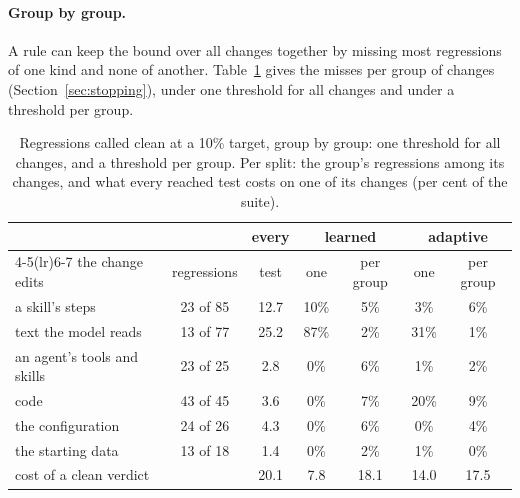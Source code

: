 \documentclass[11pt,a4paper]{article}
\begin{document}
\paragraph{Group by group.} A rule can keep the bound over all changes together by missing most regressions of
one kind and none of another. Table~\ref{tab:groups} gives the misses per group of changes
(Section~\ref{sec:stopping}), under one threshold for all changes and under a threshold per group.

\begin{table}[H]
\centering\small
\caption{Regressions called clean at a 10\% target, group by group: one threshold for all changes, and a
threshold per group. Per split: the group's regressions among its changes, and what every reached test costs on
one of its changes (per cent of the suite).}
\label{tab:groups}
\begin{tabular}{lcc cccc}
\toprule
 & & every & \multicolumn{2}{c}{learned} & \multicolumn{2}{c}{adaptive} \\
\cmidrule(lr){4-5}\cmidrule(lr){6-7}
the change edits & regressions & test & one & per group & one & per group \\
\midrule
a skill's steps & 23 of 85 & 12.7 & 10\% & 5\% & 3\% & 6\% \\
text the model reads & 13 of 77 & 25.2 & 87\% & 2\% & 31\% & 1\% \\
an agent's tools and skills & 23 of 25 & 2.8 & 0\% & 6\% & 1\% & 2\% \\
code & 43 of 45 & 3.6 & 0\% & 7\% & 20\% & 9\% \\
the configuration & 24 of 26 & 4.3 & 0\% & 6\% & 0\% & 4\% \\
the starting data & 13 of 18 & 1.4 & 0\% & 2\% & 1\% & 0\% \\
\midrule
cost of a clean verdict & & 20.1 & 7.8 & 18.1 & 14.0 & 17.5 \\
\bottomrule
\end{tabular}
\end{table}
\end{document}
